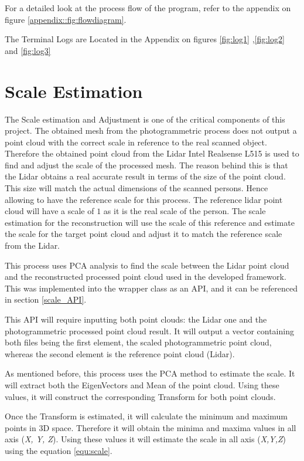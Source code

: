 \documentclass[12pt]{report}
\begin{document}
For a detailed look at the process flow of the program, refer to the appendix on figure \ref{appendix::fig:flowdiagram}.

The Terminal Logs are Located  in the Appendix on figures \ref{fig:log1} ,\ref{fig:log2} and \ref{fig:log3}






\section{Scale Estimation}
\label{sectoin:Scale_est}
The Scale estimation and Adjustment is one of the critical components of this project. 
The obtained mesh from the photogrammetric process does not output a point cloud with the correct scale in reference to the real scanned object. 
Therefore the obtained point cloud from the Lidar Intel Realsense L515 is used to find and adjust the scale of the processed mesh. 
The reason behind this is that the Lidar obtains a real accurate result in terms of the size of the point cloud. 
This size will match the actual dimensions of the scanned persons. Hence allowing to have the reference scale for this process. 
The reference lidar point cloud will have a scale of $1$ as it is the real scale of the person. 
The scale estimation for the reconstruction will use the scale of this reference and estimate the scale for the target point cloud and adjust it to match the reference scale from the Lidar. 

This process uses PCA analysis to find the scale between the Lidar point cloud and the reconstructed processed point cloud used in the developed framework. 
This was implemented into the wrapper class as an API, and it can be referenced in section \ref{scale_API}.

This API will require inputting both point clouds: the Lidar one and the photogrammetric processed point cloud result. It will output a  vector containing both files being the first element, the scaled photogrammetric point cloud, whereas the second element is the reference point cloud (Lidar).

As mentioned before, this process uses the PCA method to estimate the scale.
It will extract both the EigenVectors and Mean of the point cloud. 
Using these values, it will construct the corresponding Transform for both point clouds. 

Once the Transform is estimated, it will calculate the minimum and maximum points in 3D space. Therefore it will obtain the minima and maxima values in all axis (\textit{X, Y, Z}).
Using these values it will estimate the scale in all axis (\textit{X,Y,Z}) using the equation  \ref{equ:scale}.
\end{document}
